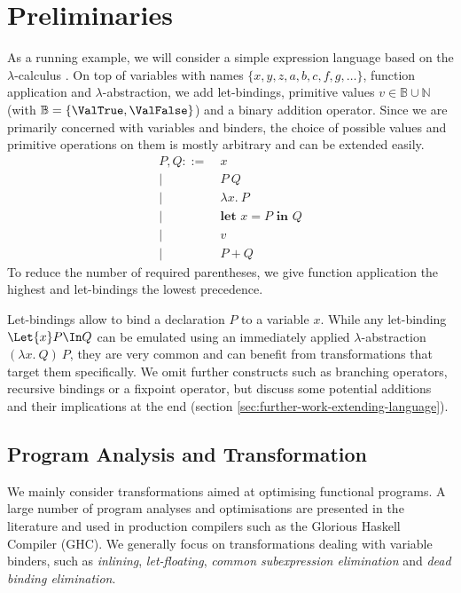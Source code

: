 \chapter{Preliminaries}
\label{ch:preliminaries}
    As a running example, we will consider a simple expression language
    based on the $\lambda$-calculus
    \cite{Barendregt1985LambdaCalculus}.
    On top of variables with names $\{ x, y, z, a, b, c, f, g, \ldots \}$, function application and $\lambda$-abstraction,
    we add let-bindings, primitive values $v \in \mathbb{B} \cup \mathbb{N}$ (with $\mathbb{B} = \{ \ValTrue , \ValFalse \}$) and a binary addition operator.
    Since we are primarily concerned with variables and binders,
    the choice of possible values and primitive operations on them is mostly arbitrary and can be extended easily.
    \begin{align*}
      P, Q ::=&\ x
      \\ \big|&\ P\ Q
      \\ \big|&\ \lambda x.\ P
      \\ \big|&\ \textbf{let } x = P \textbf{ in } Q
      \\ \big|&\ v
      \\ \big|&\ P + Q
    \end{align*}
    To reduce the number of required parentheses,
    we give function application the highest
    and let-bindings the lowest precedence.

    Let-bindings allow to bind a declaration $P$ to a variable $x$.
    While any let-binding $\Let{x} P \In Q$ can be emulated
    using an immediately applied $\lambda$-abstraction $(\lambda x.\ Q)\ P$,
    they are very common and can benefit
    from transformations that target them specifically.
    We omit further constructs such as branching operators,
    recursive bindings or a fixpoint operator,
    but discuss some potential additions and their implications
    at the end (section \ref{sec:further-work-extending-language}).

\section{Program Analysis and Transformation}
\label{sec:program-transformations}
    We mainly consider transformations aimed at optimising functional programs.
    A large number of program analyses and optimisations are presented in the literature
    \cite{Nielson1999PrinciplesProgramAnalysis,Santos1995CompilationByTransformation}
    and used in production compilers such as the Glorious Haskell Compiler (GHC).
    We generally focus on transformations dealing with variable binders,
    such as
    \emph{inlining},
    \emph{let-floating},
    \emph{common subexpression elimination} and
    \emph{dead binding elimination}.

